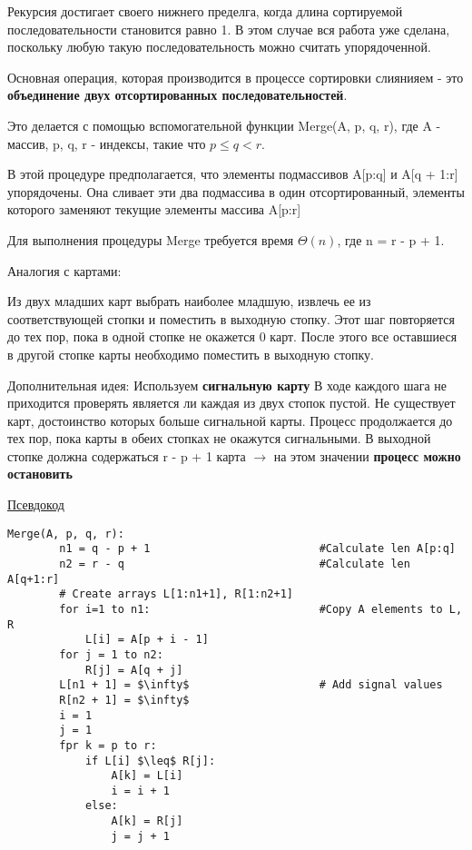 \documentclass[a4paper, 12pt]{article}
\begin{document}
\begin{enumerate}
Рекурсия достигает своего нижнего пределга, когда длина сортируемой последовательности становится равно 1.
В этом случае вся работа уже сделана, поскольку любую такую последовательность можно считать упорядоченной.

Основная операция, которая производится в процессе сортировки слиянияем - 
это \textbf{объединение двух отсортированных последовательностей}.

Это делается с помощью вспомогательной функции Merge(A, p, q, r), где A - массив, p, q, r - индексы, такие что $p \leq q < r$.

В этой процедуре предполагается, что элементы подмассивов A[p:q] и A[q + 1:r] упорядочены. 
Она сливает эти два подмассива в один отсортированный, элементы которого заменяют текущие элементы массива A[p:r]

Для выполнения процедуры Merge требуется время $\Theta(n)$, где n = r - p + 1.

Аналогия с картами:

Из двух младших карт выбрать наиболее младшую, извлечь ее из соответствующей стопки и поместить в выходную стопку. 
Этот шаг повторяется до тех пор, пока в одной стопке не окажется 0 карт. После этого все оставшиеся в другой стопке карты 
необходимо поместить в выходную стопку.

Дополнительная идея: Используем \textbf{сигнальную карту}
В ходе каждого шага не приходится проверять является ли каждая из двух стопок пустой. 
Не существует карт, достоинство которых больше сигнальной карты. Процесс продолжается до тех пор,
пока карты в обеих стопках не окажутся сигнальными. 
В выходной стопке должна содержаться r - p + 1 карта $\rightarrow$ на этом значении \textbf{процесс можно остановить}

\underline{Псевдокод}

\begin{lstlisting}[mathescape = true]
    Merge(A, p, q, r):
        n1 = q - p + 1                          #Calculate len A[p:q]
        n2 = r - q                              #Calculate len A[q+1:r]
        # Create arrays L[1:n1+1], R[1:n2+1]
        for i=1 to n1:                          #Copy A elements to L, R
            L[i] = A[p + i - 1]
        for j = 1 to n2:
            R[j] = A[q + j]
        L[n1 + 1] = $\infty$                    # Add signal values
        R[n2 + 1] = $\infty$
        i = 1
        j = 1
        fpr k = p to r:
            if L[i] $\leq$ R[j]:
                A[k] = L[i]
                i = i + 1
            else:
                A[k] = R[j]
                j = j + 1
\end{lstlisting}


\end{enumerate}
\end{document}
